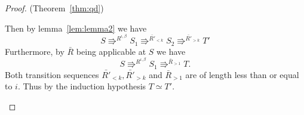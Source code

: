 \begin{proof}{(Theorem~\ref{thm:qd})}
\begin{description}
      Then by lemma~\ref{lem:lemma2} we have
      \begin{equation*}
        S \Rrightarrow^{{R}^{\iota, \beta}} S_1 \Rrightarrow^{\bar{R'}_{<k}}
        S_2 \Rrightarrow^{\bar{R'}_{>k}} T'
      \end{equation*}
      Furthermore, by $\bar{R}$ being applicable at $S$ we have
      \begin{equation*}
        S \Rrightarrow^{R^{\iota, \beta}} S_1 \Rrightarrow^{\bar{R}_{>1}}
        T.
      \end{equation*}
      Both transition sequences $\bar{R'}_{<k}, \bar{R'}_{>k}$ and
      $\bar{R}_{>1}$ are of length less than or equal to $i$.  Thus by the
      induction hypothesis $T \simeq T'$.
  \end{description}
\end{proof}






